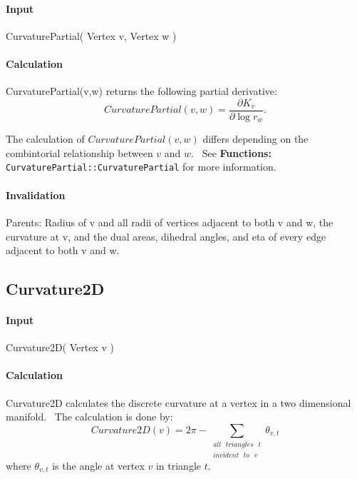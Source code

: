 \paragraph{Input}

CurvaturePartial( Vertex v, Vertex w )

\paragraph{Calculation}

CurvaturePartial(v,w) returns the following partial derivative:%
\begin{equation*}
CurvaturePartial(v,w)=\frac{\partial K_{v}}{\partial \log r_{w}}.
\end{equation*}

The calculation of $CurvaturePartial(v,w)$ differs depending on the
combintorial relationship between $v$ and $w$. \ See \textbf{Functions: }%
\texttt{CurvaturePartial::CurvaturePartial} for more information.

\paragraph{Invalidation}

Parents: Radius of v and all radii of vertices adjacent to both v and w, the
curvature at v, and the dual areas, dihedral angles, and eta of every edge
adjacent to both v and w.

\subsection{Curvature2D}

\paragraph{Input}

Curvature2D( Vertex v )

\paragraph{Calculation}

Curvature2D calculates the discrete curvature at a vertex in a two
dimensional manifold. \ The calculation is done by:%
\begin{equation*}
Curvature2D\left( v\right) =2\pi -\sum\limits_{\substack{ all\text{ }%
triangles\text{ }t  \\ incident\text{ }to\text{ }v}}\theta _{v,t}
\end{equation*}%
where $\theta _{v,t}$ is the angle at vertex $v$ in triangle $t$. \ 


